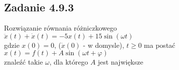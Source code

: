 \pagebreak
\subsection*{Zadanie 4.9.3} {\color{darkgray}
	Rozwiązanie równania różniczkowego\\
	$\ddot{x}(t)+\dot{x}(t)=-5x(t)+15\sin({\omega t})$\\
	gdzie $x(0)=0$, ($\dot{x}(0)$ - w domysle), $t \geq 0$ ma postać\\
	$x(t)=f(t)+A\sin({\omega t+\varphi})$\\
	znaleźć takie $\omega$, dla którego $A$ jest największe\\
}\lineh
\\\\

\pagebreak
